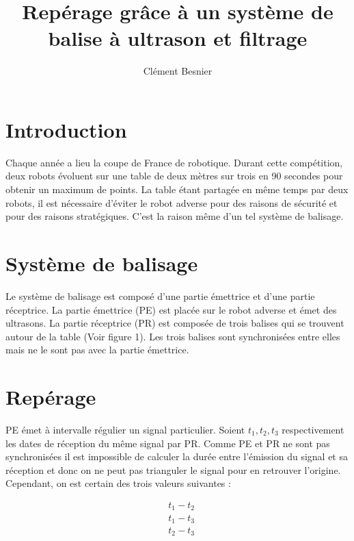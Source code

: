 \documentclass[a4paper, 8pt]{article}
\title{Repérage grâce à un système de balise à ultrason et filtrage}
\author{Clément Besnier}
\begin{document}
\maketitle
\tableofcontents
\section{Introduction}

Chaque année a lieu la coupe de France de robotique. Durant cette compétition, deux robots évoluent sur une table de deux mètres sur trois en 90 secondes pour obtenir un maximum de points. La table étant partagée en même temps par deux robots, il est nécessaire d'éviter le robot adverse pour des raisons de sécurité et pour des raisons stratégiques. C'est la raison même d'un tel système de balisage.



\centerline{}


\section{Système de balisage}

Le système de balisage est composé d'une partie émettrice et d'une partie réceptrice. La partie émettrice (PE) est placée sur le robot adverse et émet des ultrasons. La partie réceptrice (PR) est composée de trois balises qui se trouvent autour de la table (Voir figure 1). Les trois balises sont synchronisées entre elles mais ne le sont pas avec la partie émettrice. 

\section{Repérage}

PE émet à intervalle régulier un signal particulier. Soient $ t_{1}, t_{2}, t_{3}$  respectivement les dates de réception du même signal par PR. Comme PE et PR ne sont pas synchronisées il est impossible de calculer la durée entre l'émission du signal et sa réception et donc on ne peut pas trianguler le signal pour en retrouver l'origine. Cependant, on est certain des trois valeurs suivantes : 


\begin{equation}\label{1}
		\begin{split}
		& t_{1} - t_{2}\\
		& t_{1} - t_{3}\\
		& t_{2} - t_{3}
		\end{split}
\end{equation}
\end{document}
